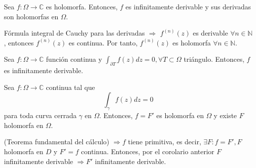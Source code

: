 
\begin{cor}
  Sea $f : \Omega \to \mathbb{C}$ es holomorfa. Entonces, $f$ es infinitamente derivable y sus derivadas son holomorfas en $\Omega$.
\end{cor}

\begin{dem}
  Fórmula integral de Cauchy para las derivadas $\Rightarrow$ $f^{(n)}(z)$ es derivable $\forall n \in \mathbb{N}$, entonces $f^{(n)}(z)$ es continua. Por tanto, $f^{(n)}(z)$ es holomorfa $\forall n \in \mathbb{N}$.
\end{dem}

\begin{theo}[Morera]
  Sea $f: \Omega \to \mathbb{C}$ función continua y $\int_{\partial T}^{} f(z) dz = 0, \forall T \subset \Omega$ triángulo. Entonces, $f$ es infinitamente derivable.
\end{theo}

\begin{obs}
  Sea $f : \Omega \to \mathbb{C} $ continua tal que
  \[ 
    \int_{\gamma}^{} f(z) dz = 0
  \] 
  para toda curva cerrada $\gamma$ en $\Omega$. Entonces, $f = F'$ es holomorfa en $\Omega$ y existe $F$ holomorfa en $\Omega$.
\end{obs}

\begin{dem}
  (Teorema fundamental del cálculo) $\Rightarrow f$ tiene primitiva, es decir, $\exists F: f = F', F$ holomorfa en $D$ y $F' = f$  continua. Entonces, por el corolario anterior $F$ infinitamente derivable $\Rightarrow F'$ infinitamente derivable.
\end{dem}
